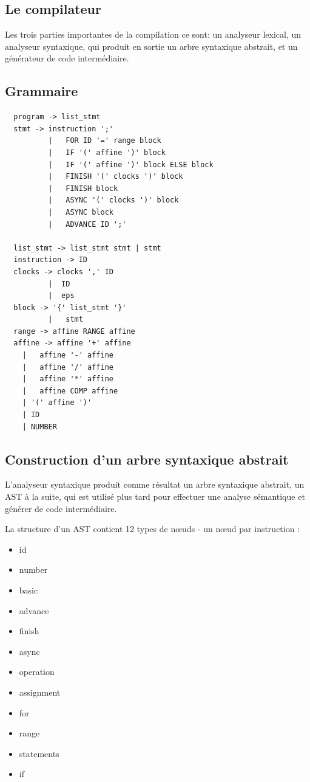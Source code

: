 \documentclass[12pt]{scrartcl}
\begin{document}
\newpage

\subsection{Le compilateur}
Les trois parties importantes de la compilation ce sont: un analyseur lexical, un analyseur syntaxique,
 qui produit en sortie un arbre syntaxique abstrait, et un générateur de code intermédiaire.

\subsection{Grammaire}
\begin{lstlisting}
  program -> list_stmt
  stmt -> instruction ';' 
          |   FOR ID '=' range block 
          |   IF '(' affine ')' block  
          |   IF '(' affine ')' block ELSE block
          |   FINISH '(' clocks ')' block
          |   FINISH block
          |   ASYNC '(' clocks ')' block
          |   ASYNC block
          |   ADVANCE ID ';'

  list_stmt -> list_stmt stmt | stmt
  instruction -> ID
  clocks -> clocks ',' ID
          |  ID
          |  eps
  block -> '{' list_stmt '}'
          |   stmt
  range -> affine RANGE affine
  affine -> affine '+' affine
    |   affine '-' affine
    |   affine '/' affine
    |   affine '*' affine
    |   affine COMP affine
    | '(' affine ')'
    | ID
    | NUMBER
\end{lstlisting}
\newpage

\subsection{Construction d'un arbre syntaxique abstrait}
L'analyseur syntaxique produit comme résultat un arbre syntaxique abstrait, un AST à la suite, 
qui est utilisé plus tard pour effectuer une analyse sémantique et générer de code intermédiaire.

La structure d'un AST contient 12 types de nœuds - un nœud par instruction  : 
\begin{itemize} 
  \item id
  \item number
  \item basic
  \item advance
  \item finish
  \item async
  \item operation
  \item assignment
  \item for 
  \item range
  \item statements
  \item if
\end{itemize}
\end{document}
